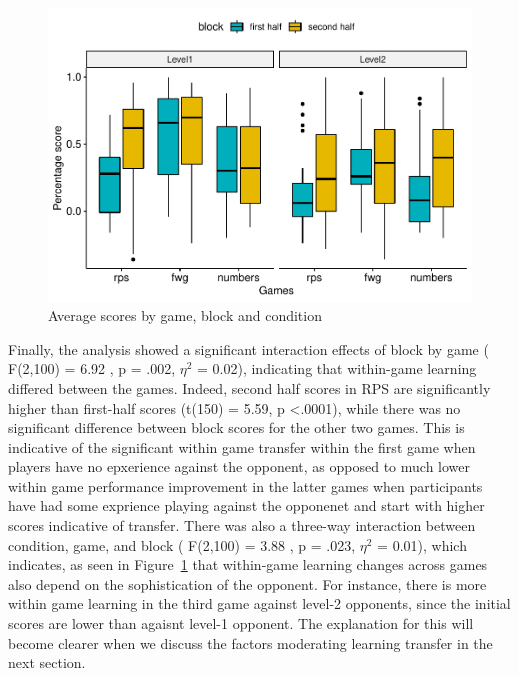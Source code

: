 \documentclass[man,floatsintext]{apa6}
\begin{document}
\begin{figure}

{\centering \includegraphics{draft_report_v1_files/figure-latex/exp1-3factor-plot-1} 

}

\caption{Average scores by game, block and condition}\label{fig:exp1-3factor-plot}
\end{figure}

Finally, the analysis showed a significant interaction effects of block by game ( F(2,100) = 6.92 , p = .002, \(\eta^{2}\) = 0.02), indicating that within-game learning differed between the games. Indeed, second half scores in RPS are significantly higher than first-half scores (t(150) = 5.59, p \textless{}.0001), while there was no significant difference between block scores for the other two games. This is indicative of the significant within game transfer within the first game when players have no epxerience against the opponent, as opposed to much lower within game performance improvement in the latter games when participants have had some exprience playing against the opponenet and start with higher scores indicative of transfer. There was also a three-way interaction between condition, game, and block ( F(2,100) = 3.88 , p = .023, \(\eta^{2}\) = 0.01), which indicates, as seen in Figure~\ref{fig:exp1-3factor-plot} that within-game learning changes across games also depend on the sophistication of the opponent. For instance, there is more within game learning in the third game against level-2 opponents, since the initial scores are lower than agaisnt level-1 opponent. The explanation for this will become clearer when we discuss the factors moderating learning transfer in the next section.
\end{document}
